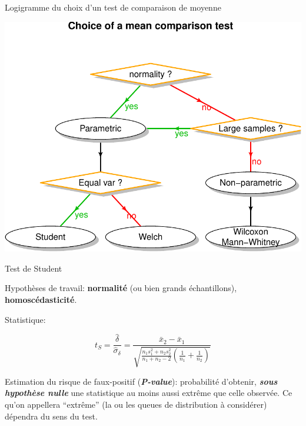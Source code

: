 \documentclass[ignorenonframetext,]{beamer}
\begin{document}
\begin{frame}{Logigramme du choix d'un test de comparaison de moyenne}
\protect\hypertarget{logigramme-du-choix-dun-test-de-comparaison-de-moyenne}{}

\begin{center}\includegraphics{figures/sampling-estimation_mean_compa_flowchart-1} \end{center}

\end{frame}

\begin{frame}{Test de Student}
\protect\hypertarget{test-de-student}{}

Hypothèses de travail: \textbf{normalité} (ou bien grands échantillons),
\textbf{homoscédasticité}.

Statistique:

\[t_{S} = \frac{\hat{\delta}}{\hat{\sigma}_\delta} =  \frac{\bar{x}_{2} - \bar{x}_{1}}{\sqrt{\frac{n_1 s_{1}^2 + n_2 s_{2}^2}{n_1+n_2-2} \left(\frac{1}{n_1}+ \frac{1}{n_2}\right)}}\]

Estimation du risque de faux-positif (\textbf{\emph{P-value}}):
probabilité d'obtenir, \textbf{\emph{sous hypothèse nulle}} une
statistique au moins aussi extrême que celle observée. Ce qu'on
appellera ``extrême'' (la ou les queues de distribution à considérer)
dépendra du sens du test.

\end{frame}
\end{document}
